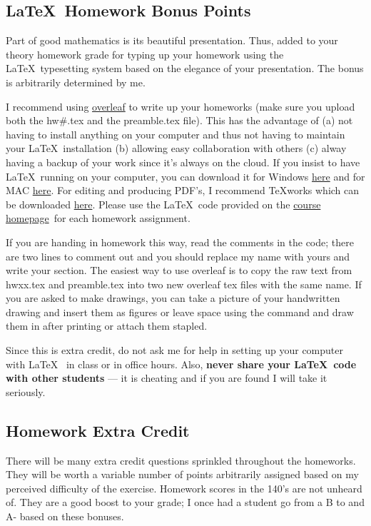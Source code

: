 \documentclass[12pt]{article}
\newcommand{\coursewebpage}{\href{https://github.com/kapelner/QC_Math_390.4_Spring_2020}{course homepage}}
\begin{document}
\subsection*{\LaTeX~Homework Bonus Points}

Part of good mathematics is its beautiful presentation. Thus,  added to your theory homework grade  for typing up your homework using the \LaTeX ~typesetting system based on the elegance of your presentation. The bonus is arbitrarily determined by me.

I recommend using \href{http://overleaf.com}{overleaf} to write up your homeworks (make sure you upload both the hw\#.tex and the preamble.tex file). This has the advantage of (a) not having to install anything on your computer and thus not having to maintain your \LaTeX ~installation (b) allowing easy collaboration with others (c) alway having a backup of your work since it's always on the cloud. If you insist to have \LaTeX ~running on your computer, you can download it for Windows \href{http://www.miktex.org/download}{here} and for MAC \href{http://www.tug.org/mactex/}{here}. For editing and producing PDF's, I recommend \TeX works which can be downloaded \href{http://www.tug.org/texworks/#Getting_TeXworks}{here}. Please use the \LaTeX ~code provided on the \coursewebpage ~for each homework assignment. 

If you are handing in homework this way, read the comments in the code; there are two lines to comment out and you should replace my name with yours and write your section. The easiest way to use overleaf is to copy the raw text from hwxx.tex and preamble.tex into two new overleaf tex files with the same name. If you are asked to make drawings, you can take a picture of your handwritten drawing and insert them as figures or leave space using the  command and draw them in after printing or attach them stapled.

Since this is extra credit, do not ask me for help in setting up your computer with \LaTeX~ in class or in office hours. Also, \textbf{never share your \LaTeX~code with other students} --- it is cheating and if you are found I will take it seriously.

\subsection*{Homework Extra Credit}

There will be many extra credit questions sprinkled throughout the homeworks. They will be worth a variable number of points arbitrarily assigned based on my perceived difficulty of the exercise. Homework scores in the 140's are not unheard of. They are a good boost to your grade; I once had a student go from a B to and A- based on these bonuses.
\end{document}
